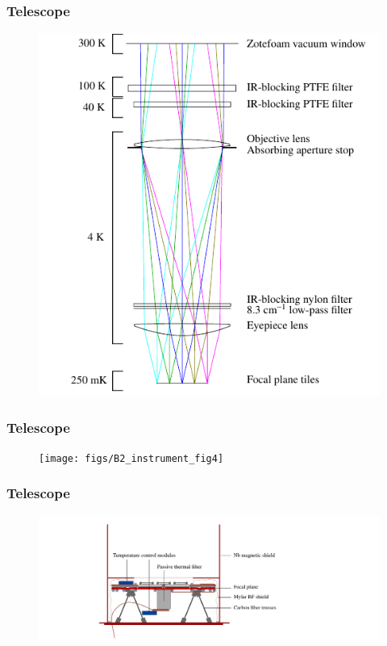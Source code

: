 \documentclass[]{beamer}
\begin{document}
\begin{frame}
  \frametitle{Telescope}
  \begin{figure}
    \centering
     \includegraphics[height=.8\textheight]
     {figs/B2_instrument_fig3}
  \end{figure}
\end{frame}
\begin{frame}
  \frametitle{Telescope}
  \begin{figure}
    \centering
     \texttt{[image: figs/B2\_instrument\_fig4]}
  \end{figure}
\end{frame}
\begin{frame}
  \frametitle{Telescope}
  \begin{figure}
    \centering
     \includegraphics[width=\textwidth]
     {figs/B2_instrument_fig5}
  \end{figure}
\end{frame}
\end{document}
